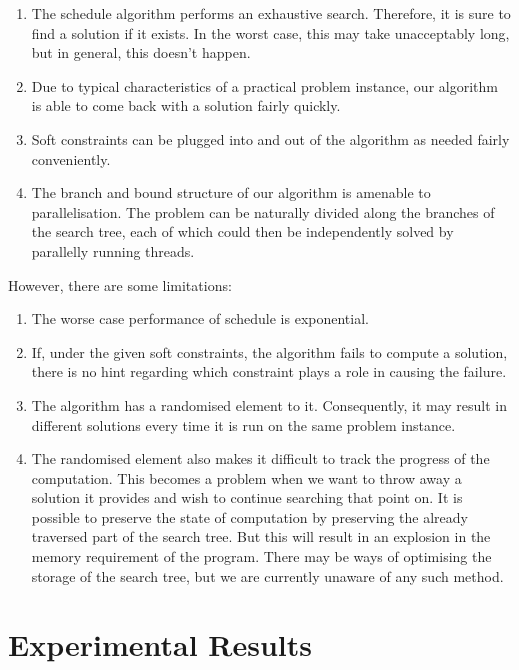 \documentclass[11pt,a4paper]{article}
\begin{document}
\begin{enumerate}
	\item The \textsf{schedule} algorithm performs an exhaustive search. Therefore, it is sure to find a solution if it exists. In the worst case, this may take unacceptably long, but in general, this doesn't happen.
	\item Due to typical characteristics of a practical problem instance, our algorithm is able to come back with a solution fairly quickly.
	\item Soft constraints can be plugged into and out of the algorithm as needed fairly conveniently.
	\item The branch and bound structure of our algorithm is amenable to parallelisation. The problem can be naturally divided along the branches of the search tree, each of which could then be independently solved by parallelly running threads.
\end{enumerate}



However, there are some limitations:
\begin{enumerate}
	\item The worse case performance of \textsf{schedule} is exponential.
	\item If, under the given soft constraints, the algorithm fails to compute a solution, there is no hint regarding which constraint plays a role in causing the failure.
	\item The algorithm has a randomised element to it. Consequently, it may result in different solutions every time it is run on the same problem instance.
	\item The randomised element also makes it difficult to track the progress of the computation. This becomes a problem when we want to throw away a solution it provides and wish to continue searching that point on. It is possible to preserve the state of computation by preserving the already traversed part of the search tree. But this will result in an explosion in the memory requirement of the program. There may be ways of optimising the storage of the search tree, but we are currently unaware of any such method.
\end{enumerate}

\section{Experimental Results}
\end{document}
